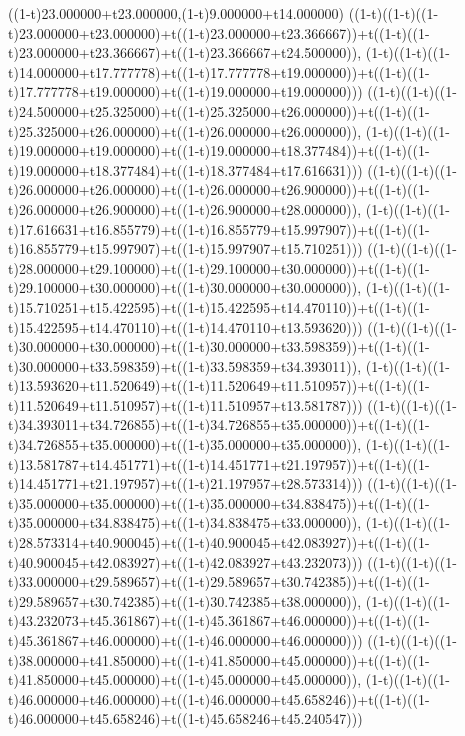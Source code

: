 ((1-t)23.000000+t23.000000,(1-t)9.000000+t14.000000)
((1-t)((1-t)((1-t)23.000000+t23.000000)+t((1-t)23.000000+t23.366667))+t((1-t)((1-t)23.000000+t23.366667)+t((1-t)23.366667+t24.500000)),                                     (1-t)((1-t)((1-t)14.000000+t17.777778)+t((1-t)17.777778+t19.000000))+t((1-t)((1-t)17.777778+t19.000000)+t((1-t)19.000000+t19.000000)))
((1-t)((1-t)((1-t)24.500000+t25.325000)+t((1-t)25.325000+t26.000000))+t((1-t)((1-t)25.325000+t26.000000)+t((1-t)26.000000+t26.000000)),                                     (1-t)((1-t)((1-t)19.000000+t19.000000)+t((1-t)19.000000+t18.377484))+t((1-t)((1-t)19.000000+t18.377484)+t((1-t)18.377484+t17.616631)))
((1-t)((1-t)((1-t)26.000000+t26.000000)+t((1-t)26.000000+t26.900000))+t((1-t)((1-t)26.000000+t26.900000)+t((1-t)26.900000+t28.000000)),                                     (1-t)((1-t)((1-t)17.616631+t16.855779)+t((1-t)16.855779+t15.997907))+t((1-t)((1-t)16.855779+t15.997907)+t((1-t)15.997907+t15.710251)))
((1-t)((1-t)((1-t)28.000000+t29.100000)+t((1-t)29.100000+t30.000000))+t((1-t)((1-t)29.100000+t30.000000)+t((1-t)30.000000+t30.000000)),                                     (1-t)((1-t)((1-t)15.710251+t15.422595)+t((1-t)15.422595+t14.470110))+t((1-t)((1-t)15.422595+t14.470110)+t((1-t)14.470110+t13.593620)))
((1-t)((1-t)((1-t)30.000000+t30.000000)+t((1-t)30.000000+t33.598359))+t((1-t)((1-t)30.000000+t33.598359)+t((1-t)33.598359+t34.393011)),                                     (1-t)((1-t)((1-t)13.593620+t11.520649)+t((1-t)11.520649+t11.510957))+t((1-t)((1-t)11.520649+t11.510957)+t((1-t)11.510957+t13.581787)))
((1-t)((1-t)((1-t)34.393011+t34.726855)+t((1-t)34.726855+t35.000000))+t((1-t)((1-t)34.726855+t35.000000)+t((1-t)35.000000+t35.000000)),                                     (1-t)((1-t)((1-t)13.581787+t14.451771)+t((1-t)14.451771+t21.197957))+t((1-t)((1-t)14.451771+t21.197957)+t((1-t)21.197957+t28.573314)))
((1-t)((1-t)((1-t)35.000000+t35.000000)+t((1-t)35.000000+t34.838475))+t((1-t)((1-t)35.000000+t34.838475)+t((1-t)34.838475+t33.000000)),                                     (1-t)((1-t)((1-t)28.573314+t40.900045)+t((1-t)40.900045+t42.083927))+t((1-t)((1-t)40.900045+t42.083927)+t((1-t)42.083927+t43.232073)))
((1-t)((1-t)((1-t)33.000000+t29.589657)+t((1-t)29.589657+t30.742385))+t((1-t)((1-t)29.589657+t30.742385)+t((1-t)30.742385+t38.000000)),                                     (1-t)((1-t)((1-t)43.232073+t45.361867)+t((1-t)45.361867+t46.000000))+t((1-t)((1-t)45.361867+t46.000000)+t((1-t)46.000000+t46.000000)))
((1-t)((1-t)((1-t)38.000000+t41.850000)+t((1-t)41.850000+t45.000000))+t((1-t)((1-t)41.850000+t45.000000)+t((1-t)45.000000+t45.000000)),                                     (1-t)((1-t)((1-t)46.000000+t46.000000)+t((1-t)46.000000+t45.658246))+t((1-t)((1-t)46.000000+t45.658246)+t((1-t)45.658246+t45.240547)))

